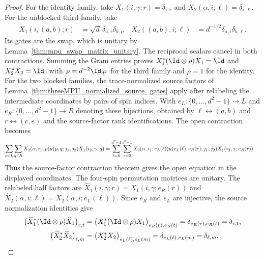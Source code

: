 \begin{proof}\leanok
    For the identity family, take
    $X_1(i,\gamma;r)=\delta_{i,r}$ and
    $X_2(\alpha,i;\ell)=\delta_{i,\ell}$. For the unblocked third family, take
    \begin{align}
        X_1(i,(a,b);r)    & =\sqrt d\,\delta_{a,r}\delta_{b,i},   &
        X_2((a,b),i;\ell) & =d^{-1/2}\delta_{a,i}\delta_{b,\ell}.
    \end{align}
    Its gates are the swap, which is unitary by
    Lemma~\ref{thm:mpu_swap_matrix_unitary}.
    The reciprocal scalars cancel in both contractions. Summing the Gram
    entries proves $X_1^*(\Id\otimes\rho)X_1=\Id$ and $X_2^*X_2=\Id$, with
    $\rho=d^{-2}\Id_{d^2}$ for the third family and $\rho=1$ for the identity.
    For the two blocked families, the trace-normalized source factors
    of Lemma~\ref{thm:threeMPU_normalized_source_gates} apply after relabeling the
    intermediate coordinates by pairs of spin indices. With
    $e_L:\{0,\ldots,d^2-1\}\to L$ and
    $e_R:\{0,\ldots,d^2-1\}\to R$ denoting these bijections, obtained by
    $\ell\leftrightarrow(a,b)$ and $r\leftrightarrow(c,e)$ and the
    source-factor rank identifications. The open contraction becomes
    \begin{align}
        \sum_{p\in L}\sum_{q\in R}
        X_2(\alpha,i_1;p)u(p,q;j_1,j_2)X_1(i_2,\gamma;q)
         & =\sum_{\ell=0}^{d^2-1}\sum_{r=0}^{d^2-1}
        X_2(\alpha,i_1;e_L(\ell))u(e_L(\ell),e_R(r);j_1,j_2)
        X_1(i_2,\gamma;e_R(r)).
        \notag
    \end{align}
    Thus the source-factor contraction theorem gives the open equation
    in the displayed coordinates. The four-spin permutation matrices are
    unitary. The relabeled half factors are
    $\widehat X_1(i,\gamma;r)=X_1(i,\gamma;e_R(r))$ and
    $\widehat X_2(\alpha,i;\ell)=X_2(\alpha,i;e_L(\ell))$. Since $e_R$
    and $e_L$ are injective, the source normalization identities give
    \begin{align}
        \bigl(\widehat X_1^*(\Id\otimes\rho)\widehat X_1\bigr)_{r,t}
         & =\bigl(X_1^*(\Id\otimes\rho)X_1\bigr)_{e_R(r),e_R(t)}
        =\delta_{e_R(r),e_R(t)}=\delta_{r,t},                    \\
        \bigl(\widehat X_2^*\widehat X_2\bigr)_{\ell,m}
         & =\bigl(X_2^*X_2\bigr)_{e_L(\ell),e_L(m)}
        =\delta_{e_L(\ell),e_L(m)}=\delta_{\ell,m}.
    \end{align}
\end{proof}

